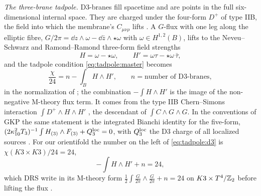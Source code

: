 \emph{The three-brane tadpole.} D3-branes fill spacetime and are points in the full
six-dimensional internal space. They are charged under the four-form $D^+$ of type IIB,
the field into which the membrane's $C_{\mu\nu\rho}$ lifts
. A $G$-flux with one leg along the elliptic fibre,
$G/2\pi=\dd z\wedge\omega-\dd\bar z\wedge\star\omega$ with $\omega\in H^{1,2}(B)$, lifts to
the Neveu--Schwarz and Ramond--Ramond three-form field strengths
\begin{equation}\label{eq:tadpole:HH}
 H=\omega-\star\omega,\qquad H'=\omega\tau-\star\omega\,\bar\tau ,
\end{equation}
and the tadpole condition \eqref{eq:tadpole:master} becomes
\begin{equation}\label{eq:tadpole:d3}
 \frac{\chi}{24}=n-\int_BH\wedge H' ,\qquad n=\text{number of D3-branes},
\end{equation}
in the normalization of ; the
combination $-\int H\wedge H'$ is the image of the non-negative M-theory flux term. It
comes from the type IIB Chern--Simons interaction $\int D^+\wedge H\wedge H'$
, the descendant of $\int C\wedge G\wedge G$. In the
conventions of GKP the same statement is the integrated Bianchi identity for the five-form,
$(2\kappa_{10}^2T_3)^{-1}\int H_{(3)}\wedge F_{(3)}+Q_3^{\rm loc}=0$, with $Q_3^{\rm loc}$
the D3 charge of all localized sources .
For our orientifold the number on the
left of \eqref{eq:tadpole:d3} is $\chi(K3\times K3)/24=24$,
\begin{equation}\label{eq:tadpole:d3k3}
 -\int H\wedge H'+n=24 ,
\end{equation}
which DRS write in its M-theory form $\frac12\int\frac G{2\pi}\wedge\frac G{2\pi}+n=24$ on
$K3\times T^4/\mathbb{Z}_2$ before lifting the flux .

